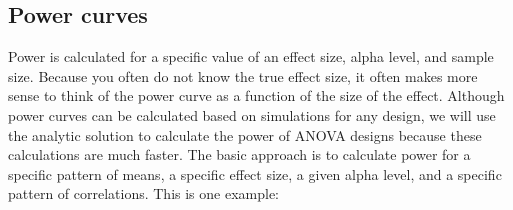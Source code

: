 \documentclass[]{article}
\title{}
\author{}
\date{}
\newenvironment{Shaded}{\begin{snugshade}}{\end{snugshade}}
\newcommand{\KeywordTok}[1]{\textcolor[rgb]{0.13,0.29,0.53}{\textbf{#1}}}
\newcommand{\DataTypeTok}[1]{\textcolor[rgb]{0.13,0.29,0.53}{#1}}
\newcommand{\StringTok}[1]{\textcolor[rgb]{0.31,0.60,0.02}{#1}}
\newcommand{\CommentTok}[1]{\textcolor[rgb]{0.56,0.35,0.01}{\textit{#1}}}
\newcommand{\OtherTok}[1]{\textcolor[rgb]{0.56,0.35,0.01}{#1}}
\newcommand{\OperatorTok}[1]{\textcolor[rgb]{0.81,0.36,0.00}{\textbf{#1}}}
\newcommand{\NormalTok}[1]{#1}
\begin{document}
\begin{Shaded}
\end{Shaded}

\subsection{Power curves}\label{power-curves}

Power is calculated for a specific value of an effect size, alpha level,
and sample size. Because you often do not know the true effect size, it
often makes more sense to think of the power curve as a function of the
size of the effect. Although power curves can be calculated based on
simulations for any design, we will use the analytic solution to
calculate the power of ANOVA designs because these calculations are much
faster. The basic approach is to calculate power for a specific pattern
of means, a specific effect size, a given alpha level, and a specific
pattern of correlations. This is one example:
\end{document}
